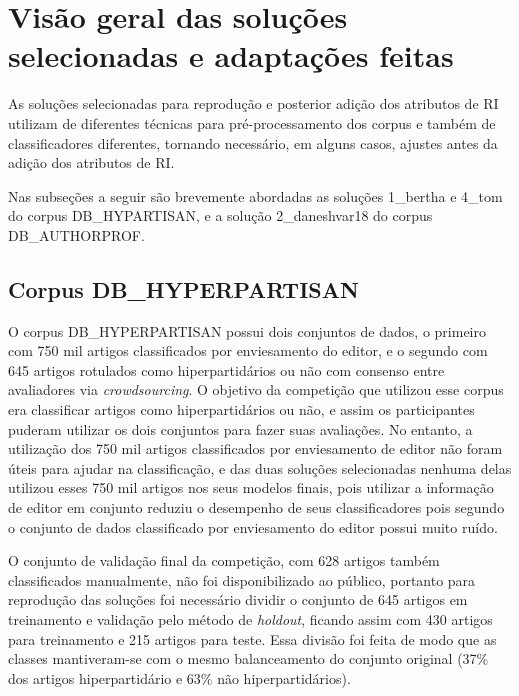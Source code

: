 	\section{Visão geral das soluções selecionadas e adaptações feitas} \label{sec:VisãoSoluçõesEAdaptações}
		As soluções selecionadas para reprodução e posterior adição dos atributos de RI utilizam de diferentes técnicas para pré-processamento dos corpus e também de classificadores diferentes, tornando necessário, em alguns casos, ajustes antes da adição dos atributos de RI.

		Nas subseções a seguir são brevemente abordadas as soluções 1\_bertha e 4\_tom do corpus DB\_HYPARTISAN, e a solução 2\_daneshvar18 do corpus DB\_AUTHORPROF.

		\subsection{Corpus DB\_HYPERPARTISAN}
			O corpus DB\_HYPERPARTISAN possui dois conjuntos de dados, o primeiro com 750 mil artigos classificados por enviesamento do editor, e o segundo com 645 artigos rotulados como hiperpartidários ou não com consenso entre avaliadores via \textit{crowdsourcing}.
			O objetivo da competição que utilizou esse corpus era classificar artigos como hiperpartidários ou não, e assim os participantes puderam utilizar os dois conjuntos para fazer suas avaliações. 
			No entanto, a utilização dos 750 mil artigos classificados por enviesamento de editor não foram úteis para ajudar na classificação, e das duas soluções selecionadas nenhuma delas utilizou esses 750 mil artigos nos seus modelos finais, pois utilizar a informação de editor em conjunto reduziu o desempenho de seus classificadores \cite[p.~840]{jiang-etal-2019-team} pois segundo  o conjunto de dados classificado por enviesamento do editor possui muito ruído.

			O conjunto de validação final da competição, com 628 artigos também classificados manualmente, não foi disponibilizado ao público, portanto para reprodução das soluções foi necessário dividir o conjunto de 645 artigos em treinamento e validação pelo método de \textit{holdout}, ficando assim com 430 artigos para treinamento e 215 artigos para teste. 
			Essa divisão foi feita de modo que as classes mantiveram-se com o mesmo balanceamento do conjunto original (37\% dos artigos hiperpartidário e 63\% não hiperpartidários).

